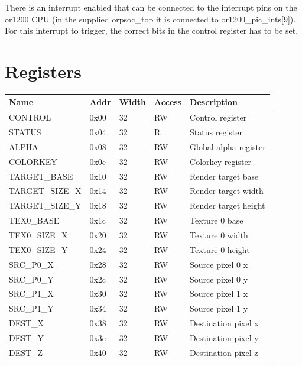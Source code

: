 \documentclass[10pt,a4paper]{article}
\begin{document}
There is an interrupt enabled that can be connected to the interrupt pins on the or1200 CPU (in the supplied orpsoc\_top it is connected to or1200\_pic\_ints[9]). For this interrupt to trigger, the correct bits in the control register has to be set.

\section{Registers}
\begin{tabular}{|l|l|l|l|l|}
\hline \textbf{Name} & \textbf{Addr} & \textbf{Width} & \textbf{Access} & \textbf{Description} \\ 
\hline
\hline CONTROL         & 0x00 & 32 & RW & Control register \\
\hline STATUS          & 0x04 & 32 & R  & Status register \\
\hline ALPHA           & 0x08 & 32 & RW & Global alpha register \\
\hline COLORKEY        & 0x0c & 32 & RW & Colorkey register \\

\hline TARGET\_BASE    & 0x10 & 32 & RW & Render target base \\
\hline TARGET\_SIZE\_X & 0x14 & 32 & RW & Render target width \\
\hline TARGET\_SIZE\_Y & 0x18 & 32 & RW & Render target height \\

\hline TEX0\_BASE      & 0x1c & 32 & RW & Texture 0 base \\
\hline TEX0\_SIZE\_X   & 0x20 & 32 & RW & Texture 0 width \\
\hline TEX0\_SIZE\_Y   & 0x24 & 32 & RW & Texture 0 height \\

\hline SRC\_P0\_X      & 0x28 & 32 & RW & Source pixel 0 x \\
\hline SRC\_P0\_Y      & 0x2c & 32 & RW & Source pixel 0 y \\
\hline SRC\_P1\_X      & 0x30 & 32 & RW & Source pixel 1 x \\
\hline SRC\_P1\_Y      & 0x34 & 32 & RW & Source pixel 1 y \\

\hline DEST\_X         & 0x38 & 32 & RW & Destination pixel x \\
\hline DEST\_Y         & 0x3c & 32 & RW & Destination pixel y \\
\hline DEST\_Z         & 0x40 & 32 & RW & Destination pixel z \\


\end{tabular}
\end{document}

